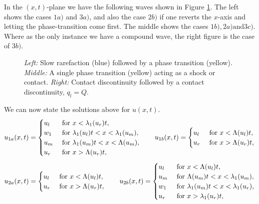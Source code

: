\documentclass[10pt]{article}
\numberwithin{equation}{section}
\begin{document}
In the $(x,t)$-plane we have the following waves shown in Figure \ref{fig:PhTSolInXT}. The left shows the cases $1a)$ and $3a)$, and also the case $2b)$ if one reverts the $x$-axis and letting the phase-transition come first. The middle shows the cases $1b), 2a) \text{and} 3c)$. Where as the only instance we have a compound wave, the right figure is the case of $3b)$. 
\begin{figure}
    \centering
    
    \caption{\textit{Left:} Slow rarefaction (blue) followed by a phase transition (yellow). \textit{Middle:} A single phase transition (yellow) acting as a shock or contact. \textit{Right:} Contact discontinuity followed by a contact discontinuity, $q_l = Q$.}
    \label{fig:PhTSolInXT}
\end{figure}
We can now state the solutions above for $u(x,t)$.
\begin{align}
    u_{1a}(x,t) = \begin{cases}
        u_l & \text{ for $ x < \lambda_1(u_r)t$}, \\
         w_1 &\text{ for $  \lambda_1(u_l)t < x < \lambda_1(u_m)$}, \\
        u_m & \text{ for $  \lambda_1(u_m)t < x < \Lambda(u_m)$}, \\
        u_r & \text{ for $x > \Lambda(u_r)t$},
    \end{cases} 
    \quad \quad 
    u_{1b}(x,t) = \begin{cases}
        u_l & \text{ for $ x < \Lambda(u_l)t$}, \\
        u_r & \text{ for $x > \Lambda( u_r)t$},
    \end{cases} 
    \label{Eq:Sol1}
\end{align}
\begin{align}
    u_{2a}(x,t) = \begin{cases}
        u_l & \text{ for $ x < \Lambda(u_l)t$}, \\
        u_r & \text{ for $x > \Lambda( u_r)t$},
    \end{cases} 
    \quad \quad 
    u_{2b}(x,t) = \begin{cases}
        u_l & \text{ for $ x < \Lambda(u_l)t$}, \\
        u_m & \text{ for $  \Lambda(u_m)t < x < \lambda_1(u_m)$}, \\
        w_1 &\text{ for $  \lambda_1(u_m)t < x < \lambda_1(u_r)$}, \\
        u_r & \text{ for $x > \lambda_1( u_r)t$},
    \end{cases} 
    \label{Eq:Sol2}
\end{align}
\end{document}
